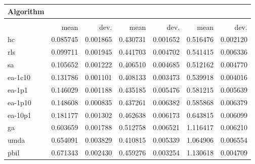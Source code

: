 \begin{tabular}{@{} l *{6}{>{{}}N{1}{2}} @{}}
\toprule
{Algorithm} &  \\
\midrule
&  &  &  \\
\midrule
& {mean} & {dev.} & {mean} & {dev.} & {mean} & {dev.} \\
\midrule
hc & 0.085745 & 0.001865 & 0.430731 & 0.001652 & 0.516476 & 0.002120 \\
rls & 0.099711 & 0.001945 & 0.441703 & 0.004702 & 0.541415 & 0.006336 \\
sa & 0.105652 & 0.001222 & 0.406510 & 0.004685 & 0.512162 & 0.004770 \\
ea-1c10 & 0.131786 & 0.001101 & 0.408133 & 0.003473 & 0.539918 & 0.004016 \\
ea-1p1 & 0.146029 & 0.001188 & 0.435185 & 0.005476 & 0.581215 & 0.005639 \\
ea-1p10 & 0.148608 & 0.000835 & 0.437261 & 0.006382 & 0.585868 & 0.006379 \\
ea-10p1 & 0.181177 & 0.001302 & 0.462638 & 0.006173 & 0.643815 & 0.006099 \\
ga & 0.603659 & 0.001788 & 0.512758 & 0.006521 & 1.116417 & 0.006210 \\
umda & 0.654091 & 0.003829 & 0.410815 & 0.005339 & 1.064906 & 0.006554 \\
pbil & 0.671343 & 0.002430 & 0.459276 & 0.003254 & 1.130618 & 0.004709 \\
\bottomrule
\end{tabular}
